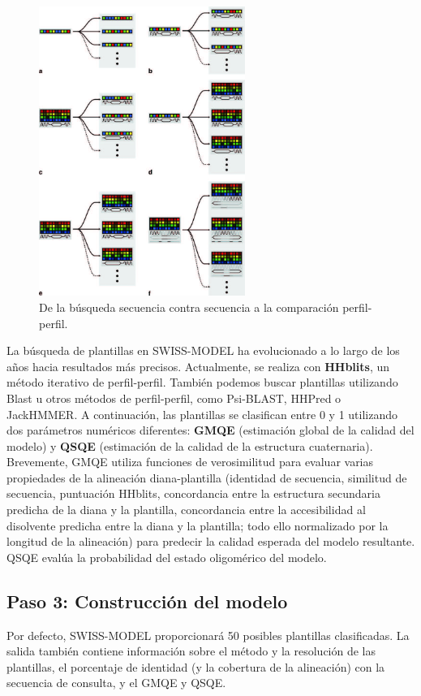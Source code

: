 \begin{figure}[h]
\centering
\includegraphics[width = 0.6\textwidth]{figs/profiles.jpg}
\caption{De la búsqueda secuencia contra secuencia a la comparación perfil-perfil.}
\end{figure}

La búsqueda de plantillas en SWISS-MODEL ha evolucionado a lo largo de los años hacia resultados más precisos. Actualmente, se realiza con \textbf{HHblits}, un método iterativo de perfil-perfil. También podemos buscar plantillas utilizando Blast u otros métodos de perfil-perfil, como Psi-BLAST, HHPred o JackHMMER. A continuación, las plantillas se clasifican entre 0 y 1 utilizando dos parámetros numéricos diferentes: \textbf{GMQE} (estimación global de la calidad del modelo) y \textbf{QSQE} (estimación de la calidad de la estructura cuaternaria). Brevemente, GMQE utiliza funciones de verosimilitud para evaluar varias propiedades de la alineación diana-plantilla (identidad de secuencia, similitud de secuencia, puntuación HHblits, concordancia entre la estructura secundaria predicha de la diana y la plantilla, concordancia entre la accesibilidad al disolvente predicha entre la diana y la plantilla; todo ello normalizado por la longitud de la alineación) para predecir la calidad esperada del modelo resultante. QSQE evalúa la probabilidad del estado oligomérico del modelo.

\subsection{Paso 3: Construcción del modelo}
Por defecto, SWISS-MODEL proporcionará 50 posibles plantillas clasificadas. La salida también contiene información sobre el método y la resolución de las plantillas, el porcentaje de identidad (y la cobertura de la alineación) con la secuencia de consulta, y el GMQE y QSQE.

